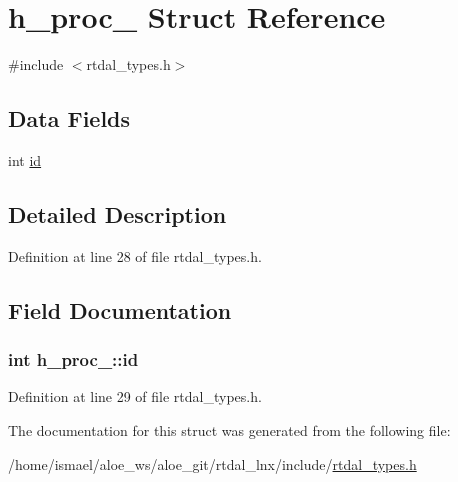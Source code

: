 \hypertarget{structh__proc__}{\section{h\-\_\-proc\-\_\- Struct Reference}
\label{structh__proc__}
}


{\ttfamily \#include $<$rtdal\-\_\-types.\-h$>$}

\subsection*{Data Fields}
\begin{DoxyCompactItemize}
\item 
int \hyperlink{structh__proc___a99d85862e419acc6daa4e5c5afa1b5d4}{id}
\end{DoxyCompactItemize}


\subsection{Detailed Description}


Definition at line 28 of file rtdal\-\_\-types.\-h.



\subsection{Field Documentation}
\hypertarget{structh__proc___a99d85862e419acc6daa4e5c5afa1b5d4}{
\subsubsection[{id}]{\setlength{\rightskip}{0pt plus 5cm}int h\-\_\-proc\-\_\-\-::id}}\label{structh__proc___a99d85862e419acc6daa4e5c5afa1b5d4}


Definition at line 29 of file rtdal\-\_\-types.\-h.



The documentation for this struct was generated from the following file\-:\begin{DoxyCompactItemize}
\item 
/home/ismael/aloe\-\_\-ws/aloe\-\_\-git/rtdal\-\_\-lnx/include/\hyperlink{rtdal__types_8h}{rtdal\-\_\-types.\-h}\end{DoxyCompactItemize}
